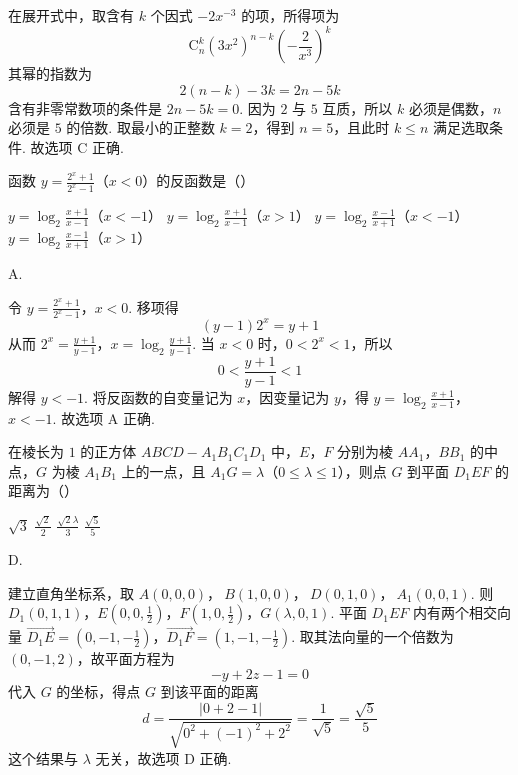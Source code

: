 \begin{solution}
在展开式中，取含有 \(k\) 个因式 \(-2x^{-3}\) 的项，所得项为
\[
\mathrm C_n^k(3x^2)^{n-k}\left(-\frac{2}{x^3}\right)^k
\]
其幂的指数为
\[
2(n-k)-3k=2n-5k
\]
含有非零常数项的条件是 \(2n-5k=0\). 因为 \(2\) 与 \(5\) 互质，所以 \(k\) 必须是偶数，\(n\) 必须是 \(5\) 的倍数. 取最小的正整数 \(k=2\)，得到 \(n=5\)，且此时 \(k\leqslant n\) 满足选取条件. 故选项 C 正确.
\end{solution}

\begin{problem}
函数 \( y = \frac{2^x + 1}{2^x - 1} \)（\(x < 0\)）的反函数是（\quad）

\choices
    {\( y = \log_2\frac{x + 1}{x - 1} \)（\(x < - 1\)）}
    {\( y = \log_2\frac{x + 1}{x - 1} \)（\(x > 1\)）}
    {\( y = \log_2\frac{x - 1}{x + 1} \)（\(x < - 1\)）}
    {\( y = \log_2\frac{x - 1}{x + 1} \)（\(x > 1\)）}
\end{problem}

\begin{answer}
A.
\end{answer}

\begin{solution}
令
\(y=\frac{2^x+1}{2^x-1}\)，\(x<0\).
移项得
\[
(y-1)2^x=y+1
\]
从而
\(2^x=\frac{y+1}{y-1}\)，\(x=\log_2\frac{y+1}{y-1}\).
当 \(x<0\) 时，\(0<2^x<1\)，所以
\[
0<\frac{y+1}{y-1}<1
\]
解得 \(y<-1\). 将反函数的自变量记为 \(x\)，因变量记为 \(y\)，得
\(y=\log_2\frac{x+1}{x-1}\)，\(x<-1\).
故选项 A 正确.
\end{solution}

\begin{problem}
在棱长为 \(1\) 的正方体 \(ABCD - A_{1}B_{1}C_{1}D_{1}\) 中，\(E\)，\(F\) 分别为棱 \(AA_{1}\)，\(BB_{1}\) 的中点，\(G\) 为棱 \(A_{1}B_{1}\) 上的一点，且 \(A_{1}G = \lambda\)（\(0 \leqslant \lambda \leqslant 1\)），则点 \(G\) 到平面 \(D_{1}EF\) 的距离为（\quad）


\choices
    {\(\sqrt{3}\)}
    {\(\frac{\sqrt{2}}{2}\)}
    {\(\frac{\sqrt{2}\lambda}{3}\)}
    {\(\frac{\sqrt{5}}{5}\)}
\end{problem}

\begin{answer}
D.
\end{answer}

\begin{solution}
建立直角坐标系，取
\(A(0,0,0)\)，\(\ B(1,0,0)\)，\(\ D(0,1,0)\)，\(\ A_1(0,0,1)\).
则
\(D_1(0,1,1)\)，\(E\left(0,0,\frac12\right)\)，\(F\left(1,0,\frac12\right)\)，\(G(\lambda,0,1)\).
平面 \(D_1EF\) 内有两个相交向量
\(\overrightarrow{D_1E}=\left(0,-1,-\frac12\right)\)，\(\overrightarrow{D_1F}=\left(1,-1,-\frac12\right)\).
取其法向量的一个倍数为 \((0,-1,2)\)，故平面方程为
\[
-y+2z-1=0
\]
代入 \(G\) 的坐标，得点 \(G\) 到该平面的距离
\[
d=\frac{|0+2-1|}{\sqrt{0^2+(-1)^2+2^2}}=\frac{1}{\sqrt5}=\frac{\sqrt5}{5}
\]
这个结果与 \(\lambda\) 无关，故选项 D 正确.
\end{solution}

